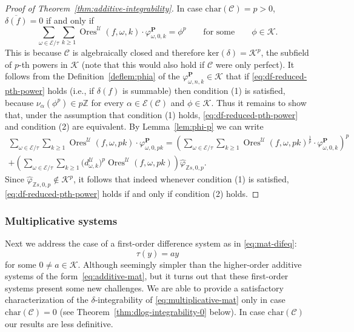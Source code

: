 \documentclass[preprint,12pt]{elsarticle}
\numberwithin{equation}{section} %
\theoremstyle{theorem}
\theoremstyle{definition}
\newcommand{\Ca}{\mathcal{C}} %
\newcommand{\bk}{\mathcal{K}} %
\newcommand{\ec}{\mathcal{E}} %
\newcommand{\orbita}{{\ec/\tau}} %
\newcommand{\Z}{\mathbb{Z}} %
\DeclareMathOperator{\ores}{Ores}
\begin{document}
\begin{proof}[Proof of Theorem~\ref{thm:additive-integrability}]
In case $\mathrm{char}(\Ca)=p>0$, $\overline{\delta(f)}=0$ if and only if
\begin{equation}\label{eq:df-reduced-pth-power}
    \sum_{\omega\in\orbita}\sum_{k\geq 1}\ores^\mathcal{U}(f,\omega,k)\cdot\varphi^\mathbf{P}_{\omega,0,k}=\phi^p\qquad\text{for some}\qquad \phi\in\bk.
\end{equation} This is because $\Ca$ is algebraically closed and therefore $\mathrm{ker}(\delta)=\bk^p$, the subfield of $p$-th powers in $\bk$ (note that this would also hold if $\Ca$ were only perfect). It follows from the Definition~\ref{deflem:phia} of the $\varphi^\mathbf{P}_{\omega,n,k}\in\bk$ that if \eqref{eq:df-reduced-pth-power} holds (i.e., if $\delta(f)$ is summable) then condition (1) is satisfied, because $\nu_\alpha(\phi^p)\in p\Z$ for every $\alpha\in\ec(\Ca)$ and $\phi\in\bk$. Thus it remains to show that, under the assumption that condition (1) holds, \eqref{eq:df-reduced-pth-power} and condition (2) are equivalent. By Lemma~\ref{lem:phi-p} we can write \begin{multline}\label{eq:f-reduced-pth-power}\sum_{\omega\in\orbita}\sum_{k\geq 1}\ores^\mathcal{U}(f,\omega,pk)\cdot\varphi^\mathbf{P}_{\omega,0,pk}=\left(\sum_{\omega\in\orbita}\sum_{k\geq 1}\ores^\mathcal{U}(f,\omega,pk)^{\frac{1}{p}}\cdot\varphi^\mathbf{P}_{\omega,0,k}\right)^p\\+\left(\sum_{\omega\in\orbita}\sum_{k\geq 1}\bigl(d^\mathcal{U}_{\omega,k}\bigr)^p\ores^\mathcal{U}(f,\omega,pk)\right)\hat{\varphi}_{\Z s,0,p}.\end{multline} Since $\hat{\varphi}_{\Z s,0,p}\notin \bk^p$, it follows that indeed whenever condition (1) is satisfied, \eqref{eq:df-reduced-pth-power} holds if and only if condition (2) holds.
\end{proof}

\subsubsection{Multiplicative systems}

Next we address the case of a first-order difference system as in \eqref{eq:mat-difeq}:
\begin{equation}\label{eq:multiplicative-mat}
    \tau(y)=ay
\end{equation} for some $0\neq a\in\bk$. Although seemingly simpler than the higher-order additive systems of the form~\eqref{eq:additive-mat}, but it turns out that these first-order systems present some new challenges. We are able to provide a satisfactory characterization of the $\delta$-integrability of \eqref{eq:multiplicative-mat} only in case $\mathrm{char}(\Ca)=0$ (see Theorem~\ref{thm:dlog-integrability-0} below). In case $\mathrm{char}(\Ca)$ our results are less definitive.
\end{document}
